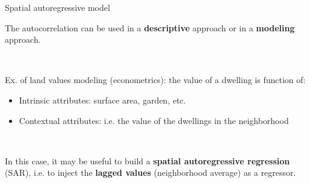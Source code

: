\begin{frame}{Spatial autoregressive model}

The autocorrelation can be used in a \textbf{descriptive} approach or in a \textbf{modeling} approach.

~

Ex. of land values modeling (econometrics): the value of a dwelling is function of:

\begin{itemize}
  \item Intrinsic attributes: surface area, garden, etc.
  \item Contextual attributes: i.e. the value of the dwellings in the neighborhood
\end{itemize}

~

In this case, it may be useful to build a \textbf{spatial autoregressive regression} (SAR), i.e. to inject the \textbf{lagged values} (neighborhood average) as a regressor.

\end{frame}


